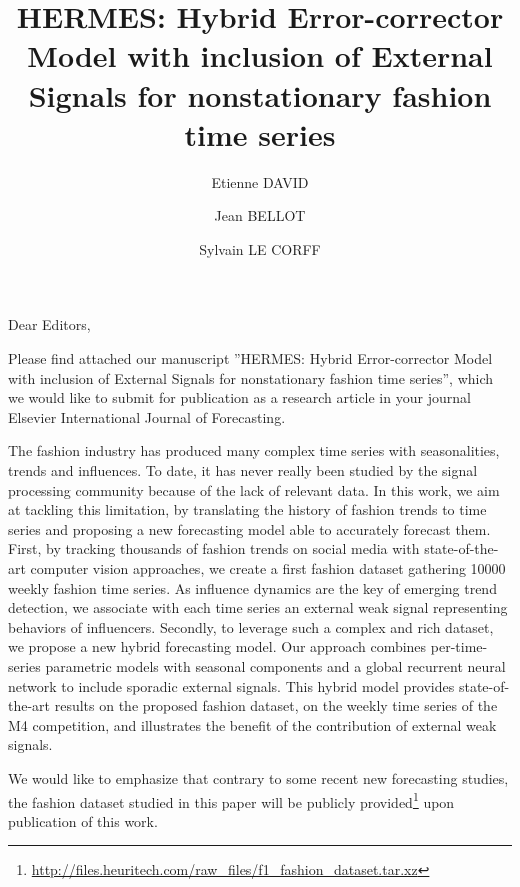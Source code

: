 \documentclass[1p]{elsarticle}
\begin{document}
\begin{frontmatter}

\title{HERMES: Hybrid Error-corrector Model with inclusion of External Signals for nonstationary fashion time series}

\author{Etienne DAVID}

\author{Jean BELLOT}

\author{Sylvain LE CORFF} 
\end{frontmatter}


\vspace{0.5cm}
Dear Editors,\vspace{0.5cm}

Please find attached our manuscript ”HERMES: Hybrid Error-corrector Model with inclusion of External Signals for nonstationary fashion time series”, which we
would like to submit for publication as a research article in your journal Elsevier International Journal of Forecasting. 

\medskip

The fashion industry has produced many complex time series with seasonalities, trends and influences. To date, it has never really been studied by the signal processing community because of the lack of relevant data. In this work, we  aim at tackling this limitation, by translating the history of fashion trends to time series and proposing a new forecasting model able to accurately forecast them. First, by tracking thousands of fashion trends on social media with state-of-the-art computer vision approaches, we create a first fashion dataset gathering 10000 weekly fashion time series. As influence dynamics are the key of emerging trend detection, we associate with each time series an external weak signal representing behaviors of influencers. Secondly, to leverage such a complex and rich dataset, we propose a new hybrid forecasting model. Our approach combines per-time-series parametric models with seasonal components and a global recurrent neural network to include sporadic external signals. This hybrid model provides state-of-the-art results on the proposed fashion dataset, on the weekly time series of the M4 competition, and illustrates the benefit of the contribution of external weak signals.

\medskip

We would like to emphasize that contrary to some recent new forecasting studies, the fashion dataset studied in this paper will be publicly provided\footnote[1]{\url{http://files.heuritech.com/raw_files/f1_fashion_dataset.tar.xz}} upon publication of this work.
\end{document}
